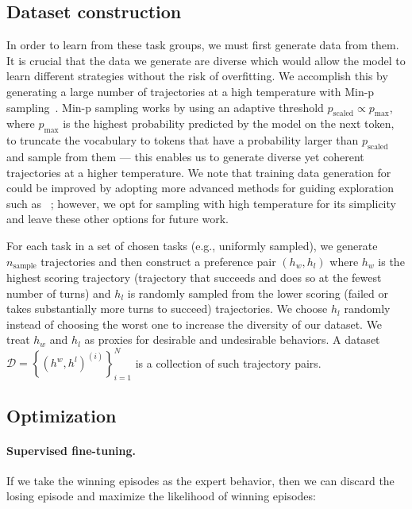 \subsection{Dataset construction}

In order to learn from these task groups, we must first generate data from them. It is crucial that the data we generate are diverse which would allow the model to learn different strategies without the risk of overfitting. We accomplish this by generating a large number of trajectories at a high temperature with Min-p sampling~\citep{nguyen2024turning}. Min-p sampling works by using an adaptive threshold $p_\text{scaled} \propto p_\text{max}$, where $p_\text{max}$ is the highest probability predicted by the model on the next token, to truncate the vocabulary to tokens that have a probability larger than $p_\text{scaled}$ and sample from them --- this enables us to generate diverse yet coherent trajectories at a higher temperature. We note that training data generation for \ours{} could be improved by adopting more advanced methods for guiding exploration such as ~\citet{murty2024bagel,yang2024react}; however, we opt for sampling with high temperature for its simplicity and leave these other options for future work.


For each task in a set of chosen tasks (e.g., uniformly sampled), we generate $n_\text{sample}$ trajectories and then construct a preference pair $(h_{w}, h_{l})$ where $h_{w}$ is the highest scoring trajectory (trajectory that succeeds and does so at the fewest number of turns) and $h_{l}$ is randomly sampled from the lower scoring (failed  or takes substantially more turns to succeed) trajectories. We choose $h_l$ randomly instead of choosing the worst one to increase the diversity of our dataset. We treat $h_w$ and $h_l$ as proxies for desirable and undesirable behaviors. A dataset $\mathcal{D} = \left\{\left(h^{w}, h^{l}\right)^{(i)}\right\}_{i=1}^N$ is a collection of such trajectory pairs.

\subsection{Optimization}
\label{sec:opt}

\paragraph{Supervised fine-tuning.} If we take the winning episodes as the expert behavior, then we can discard the losing episode and maximize the likelihood of winning episodes:

